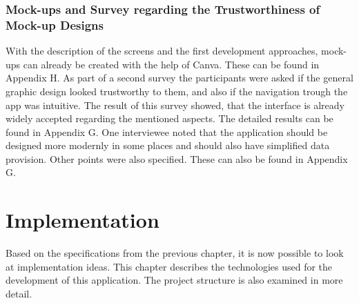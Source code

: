 \subsection{Mock-ups and Survey regarding the Trustworthiness of Mock-up Designs}
With the description of the screens and the first development approaches, mock-ups can already be created with the help of Canva. These can be found in Appendix H. As part of a second survey the participants were asked if the general graphic design looked trustworthy to them, and also if the navigation trough the app was intuitive. The result of this survey showed, that the interface is already widely accepted regarding the mentioned aspects. The detailed results can be found in Appendix G. One interviewee noted that the application should be designed more modernly in some places and should also have simplified data provision. Other points were also specified. These can also be found in Appendix G.

\chapter{Implementation}
Based on the specifications from the previous chapter, it is now possible to look at implementation ideas. This chapter describes the technologies used for the development of this application. The project structure is also examined in more detail.
